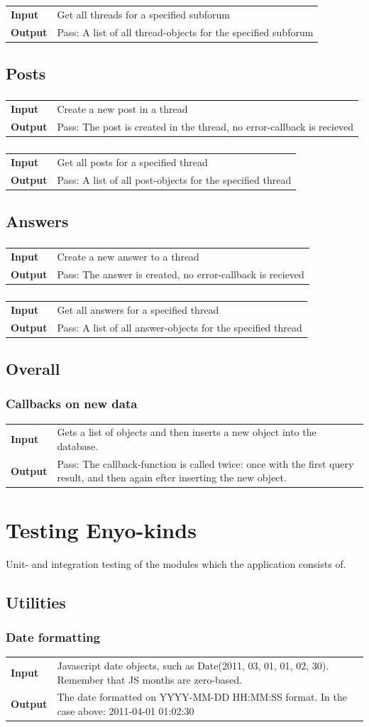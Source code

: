 \documentclass[a4paper, 12pt, titlepage]{article}
\newcommand{\testcase}[2]{
	\subsubsection{}
	\begin{tabular}{l p{11cm}}
	\bf{Input} & 
		#1\\
	\bf{Output} & 
		#2\\
	\end{tabular}
}
\newcommand{\ttestcase}[3]{
	\subsubsection{#1}
	\begin{tabular}{l p{11cm}}
	\bf{Input} & 
		#2\\
	\bf{Output} & 
		#3\\
	\end{tabular}
}
\begin{document}
		\testcase
		{
			Get all threads for a specified subforum
		}{
			Pass: A list of all thread-objects for the specified subforum
		}

	\subsection{Posts}

		\testcase
		{
			Create a new post in a thread
		}{
			Pass: The post is created in the thread, no error-callback is recieved
		}

		\testcase
		{
			Get all posts for a specified thread
		}{
			Pass: A list of all post-objects for the specified thread
		}

	\subsection{Answers}

		\testcase
		{
			Create a new answer to a thread
		}{
			Pass: The answer is created, no error-callback is recieved
		}

		\testcase
		{
			Get all answers for a specified thread
		}{
			Pass: A list of all answer-objects for the specified thread
		}


	\subsection{Overall}

		\ttestcase{Callbacks on new data}
		{
			Gets a list of objects and then inserts a new object into the database.
		}{
			Pass: The callback-function is called twice: once with the first query result, and then again efter inserting the new object.
		}

	\section{Testing Enyo-kinds}
	Unit- and integration testing of the modules which the application consists of.

	\subsection{Utilities}

		\ttestcase{Date formatting}
		{
			Javascript date objects, such as Date(2011, 03, 01, 01, 02, 30). Remember that JS months are zero-based.
		}{
			The date formatted on YYYY-MM-DD HH:MM:SS format. In the case above:
			2011-04-01 01:02:30
		}
\end{document}
